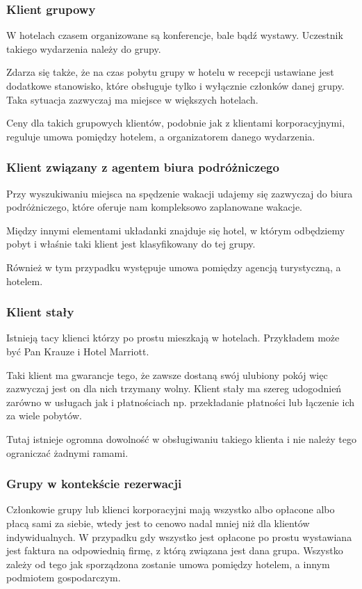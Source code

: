 \documentclass[a4paper,onecolumn,oneside,11pt,wide,floatssmall]{mwrep}
\theoremstyle{definition}
\theoremstyle{plain}%
\theoremstyle{remark}
\begin{document}
\subsubsection{Klient grupowy}
W hotelach czasem organizowane są konferencje, bale bądź wystawy. Uczestnik
takiego wydarzenia należy do grupy.

Zdarza się także, że na czas pobytu grupy w hotelu w recepcji ustawiane 
jest dodatkowe stanowisko, które obsługuje tylko i wyłącznie członków danej 
grupy. Taka sytuacja zazwyczaj ma miejsce w większych hotelach.

Ceny dla takich grupowych klientów, podobnie jak z klientami korporacyjnymi,
reguluje umowa pomiędzy hotelem, a organizatorem danego wydarzenia.

\subsubsection{Klient związany z agentem biura podróżniczego}
Przy wyszukiwaniu miejsca na spędzenie wakacji udajemy się zazwyczaj do biura
podróżniczego, które oferuje nam kompleksowo zaplanowane wakacje.

Między innymi elementami układanki znajduje się hotel, w którym odbędziemy pobyt
i właśnie taki klient jest klasyfikowany do tej grupy.

Również w tym przypadku występuje umowa pomiędzy agencją turystyczną, a hotelem.

\subsubsection{Klient stały}
Istnieją tacy klienci którzy po prostu mieszkają w hotelach. Przykładem może być
Pan Krauze i Hotel Marriott.  

Taki klient ma gwarancje tego, że zawsze dostaną
swój ulubiony pokój więc zazwyczaj jest on dla nich trzymany wolny. Klient stały
ma szereg udogodnień zarówno w usługach jak i płatnościach np. przekładanie
płatności lub łączenie ich za wiele pobytów.

Tutaj istnieje ogromna dowolność w obsługiwaniu takiego klienta i nie należy
tego ograniczać żadnymi ramami.

\subsubsection{Grupy w kontekście rezerwacji}
Członkowie grupy lub klienci korporacyjni mają wszystko albo opłacone 
albo płacą sami za siebie, wtedy jest to cenowo nadal mniej niż dla klientów 
indywidualnych. W przypadku gdy wszystko jest opłacone po prostu
wystawiana jest faktura na odpowiednią firmę, z którą związana jest dana
grupa. Wszystko zależy od tego jak sporządzona zostanie umowa pomiędzy hotelem,
a innym podmiotem gospodarczym.
\end{document}
